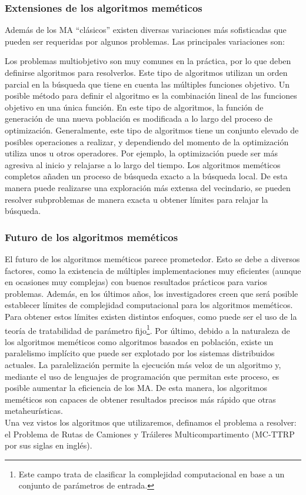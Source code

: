 \subsubsection{Extensiones de los algoritmos meméticos}
Además de los MA ``clásicos'' existen diversas variaciones más sofisticadas que pueden ser requeridas por algunos problemas. Las principales variaciones son:
\begin{itemize}
     Los problemas multiobjetivo son muy comunes en la práctica, por lo que deben definirse algoritmos para resolverlos. Este tipo de algoritmos utilizan un orden parcial en la búsqueda que tiene en cuenta las múltiples funciones objetivo. Un posible método para definir el algoritmo es la combinación lineal de las funciones objetivo en una única función.
     En este tipo de algoritmos, la función de generación de una nueva población es modificada a lo largo del proceso de optimización. Generalmente, este tipo de algoritmos tiene un conjunto elevado de posibles operaciones a realizar, y dependiendo del momento de la optimización utiliza unos u otros operadores. Por ejemplo, la optimización puede ser más agresiva al inicio y relajarse a lo largo del tiempo.
     Los algoritmos meméticos completos añaden un proceso de búsqueda exacto a la búsqueda local. De esta manera puede realizarse una exploración más extensa del vecindario, se pueden resolver subproblemas de manera exacta u obtener límites para relajar la búsqueda.
\end{itemize}

\subsubsection{Futuro de los algoritmos meméticos}
El futuro de los algoritmos meméticos parece prometedor. Esto se debe a diversos factores, como la existencia de múltiples implementaciones muy eficientes (aunque en ocasiones muy complejas) con buenos resultados prácticos para varios problemas. Además, en los últimos años, los investigadores creen que será posible establecer límites de complejidad computacional para los algoritmos meméticos. Para obtener estos límites existen distintos enfoques, como puede ser el uso de la teoría de tratabilidad de parámetro fijo\footnote{Este campo trata de clasificar la complejidad computacional en base a un conjunto de parámetros de entrada.}. Por último, debido a la naturaleza de los algoritmos meméticos como algoritmos basados en población, existe un paralelismo implícito que puede ser explotado por los sistemas distribuidos actuales. La paralelización permite la ejecución más veloz de un algoritmo y, mediante el uso de lenguajes de programación que permitan este proceso, es posible aumentar la eficiencia de los MA. De esta manera, los algoritmos meméticos son capaces de obtener resultados precisos más rápido que otras metaheurísticas.\\

Una vez vistos los algoritmos que utilizaremos, definamos el problema a resolver: el Problema de Rutas de Camiones y Tráileres Multicompartimento (MC-TTRP por sus siglas en inglés).